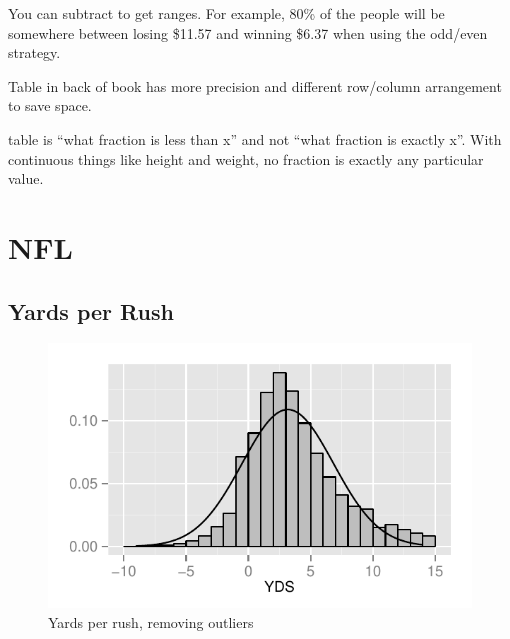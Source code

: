 \documentclass[landscape]{exam}
\begin{document}
  You can subtract to get ranges. For example, 80\% of the people will be
  somewhere between losing \$11.57 and winning \$6.37 when using the odd/even
  strategy.

  \begin{itemize*}
    \item Table in back of book has more precision and different row/column
      arrangement to save space.
    \item table is ``what fraction is less than x'' and not ``what fraction is
      exactly x''.  With continuous things like height and weight, no fraction is
      exactly any particular value.
  \end{itemize*}




  \section{NFL}

  \subsection{Yards per Rush} %
  
  \begin{figure}[H]
    \centering
    \includegraphics[scale = 0.9]{figures/nfl/yards_per_rush.pdf}
    \caption{Yards per rush, removing outliers}
  \end{figure}
\end{document}
